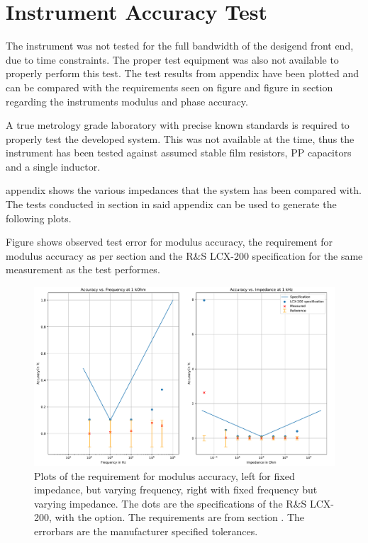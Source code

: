 \section{Instrument Accuracy Test} \label{subsec:8_1_AccTest}
The instrument was not tested for the full bandwidth of the desigend front end, due to time constraints. The proper test equipment was also not available to properly perform this test. The test results from appendix  have been plotted and can be compared with the requirements seen on figure  and figure  in section  regarding the instruments modulus and phase accuracy.

A true metrology grade laboratory with precise known standards is required to properly test the developed system. This was not available at the time, thus the instrument has been tested against assumed stable film resistors, PP capacitors and a single inductor.

appendix  shows the various impedances that the system has been compared with. The tests conducted in section  in said appendix can be used to generate the following plots. 

Figure  shows observed test error for modulus accuracy, the requirement for modulus accuracy as per section  and the R\&S LCX-200 specification for the same measurement as the test performes.




\begin{figure}[H]
    \centering
    \includegraphics[width=1\textwidth]{Sections/8_SystemVerification/Figures/SpecVTest.pdf}
    \caption{Plots of the requirement for modulus accuracy, left for fixed impedance, but varying frequency, right with fixed frequency but varying impedance. The dots are the specifications of the R\&S LCX-200, with the  option. The requirements are from section . The errorbars are the manufacturer specified tolerances.}
    \label{fig_8_ModulusAccuracy}
\end{figure}
  
